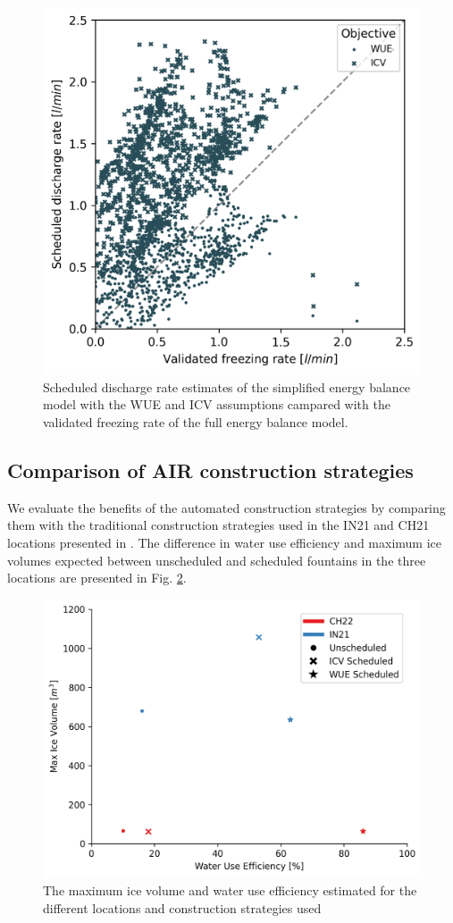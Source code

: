 \documentclass[tc, manuscript]{copernicus}
\begin{document}
\begin{figure}[t]
\includegraphics[width=12cm]{Figures/freezing_rate_corr.png}
\caption{Scheduled discharge rate estimates of the simplified energy balance model with the WUE and ICV
assumptions campared with the validated freezing rate of the full energy balance model.}
\label{fig:freezing_rate}
\end{figure}

\subsection{Comparison of AIR construction strategies}
We evaluate the benefits of the automated construction strategies by comparing them with the traditional
construction strategies used in the IN21 and CH21 locations presented in
\cite{balasubramanianInfluenceMeteorologicalConditions2022}. The difference in water use efficiency and maximum
ice volumes expected between unscheduled and scheduled fountains in the three locations are presented in Fig.
\ref{fig:wue}.

\begin{figure}[t]
\includegraphics[width=12cm]{Figures/wue.png}
\caption{The maximum ice volume and water use efficiency estimated for the different locations and construction
strategies used}
\label{fig:wue}
\end{figure}
\end{document}
